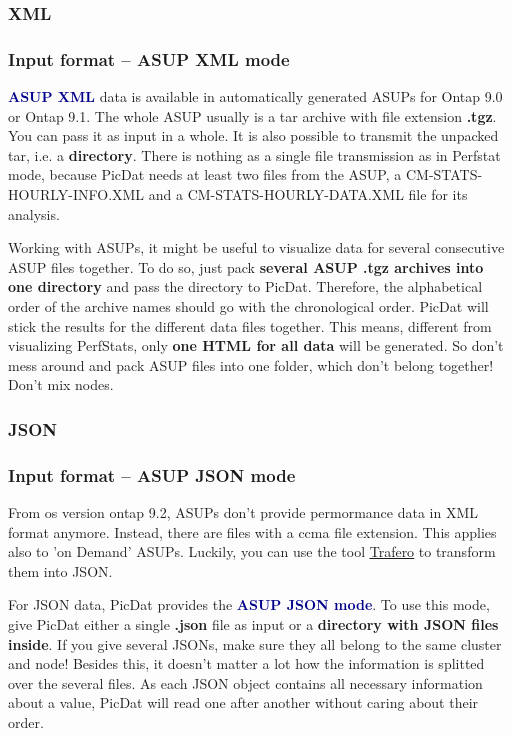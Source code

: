 \documentclass[8pt]{beamer}
\begin{document}
\subsubsection{XML}

\begin{frame}
\frametitle{Input format -- ASUP XML mode}
\textcolor{darkblue}{\textbf{ASUP XML}} data is available in automatically generated ASUPs for Ontap 9.0 or Ontap 9.1. The whole ASUP usually is a tar archive with file extension \textbf{.tgz}. You can pass it as input in a whole. It is also possible to transmit the unpacked tar, i.e. a \textbf{directory}. There is nothing as a single file transmission as in Perfstat mode, because PicDat needs at least two files from the ASUP, a CM-STATS-HOURLY-INFO.XML and a CM-STATS-HOURLY-DATA.XML file for its analysis.
\bigskip

Working with ASUPs, it might be useful to visualize data for several consecutive ASUP files together. To do so, just pack \textbf{several ASUP .tgz archives into one directory} and pass the directory to PicDat. Therefore, the alphabetical order of the archive names should go with the chronological order. PicDat will stick the results for the different data files together. This means, different from visualizing PerfStats, only \textbf{one HTML for all data} will be generated. So don't mess around and pack ASUP files into one folder, which don't belong together! Don't mix nodes.
\end{frame}

\subsubsection{JSON}

\begin{frame}
\frametitle{Input format -- ASUP JSON mode}
From os version ontap 9.2, ASUPs don't provide permormance data in XML format anymore. Instead, there are files with a ccma file extension. This applies also to 'on Demand' ASUPs. Luckily, you can use the tool \hyperref[trafero]{\underline{Trafero}} to transform them into JSON.
\bigskip

For JSON data, PicDat provides the \textcolor{darkblue}{\textbf{ASUP JSON mode}}. To use this mode, give PicDat either a single \textbf{.json} file as input or a \textbf{directory with JSON files inside}. If you give several JSONs, make sure they all belong to the same cluster and node! Besides this, it doesn't matter a lot how the information is splitted over the several files. As each JSON object contains all necessary information about a value, PicDat will read one after another without caring about their order.
\end{frame}
\end{document}

